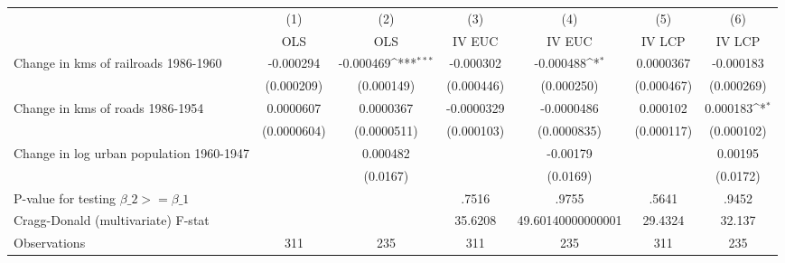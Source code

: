 {
\def\sym#1{\ifmmode^{#1}\else\(^{#1}\)\fi}
\begin{tabular}{l*{6}{c}}
\hline\hline
                &\multicolumn{1}{c}{(1)}&\multicolumn{1}{c}{(2)}&\multicolumn{1}{c}{(3)}&\multicolumn{1}{c}{(4)}&\multicolumn{1}{c}{(5)}&\multicolumn{1}{c}{(6)}\\
                &\multicolumn{1}{c}{OLS}&\multicolumn{1}{c}{OLS}&\multicolumn{1}{c}{IV EUC}&\multicolumn{1}{c}{IV EUC}&\multicolumn{1}{c}{IV LCP}&\multicolumn{1}{c}{IV LCP}\\
\hline
Change in kms of railroads 1986-1960&-0.000294         &-0.000469\sym{***}&-0.000302         &-0.000488\sym{*}  &0.0000367         &-0.000183         \\
                &(0.000209)         &(0.000149)         &(0.000446)         &(0.000250)         &(0.000467)         &(0.000269)         \\
[1em]
Change in kms of roads 1986-1954&0.0000607         &0.0000367         &-0.0000329         &-0.0000486         & 0.000102         & 0.000183\sym{*}  \\
                &(0.0000604)         &(0.0000511)         &(0.000103)         &(0.0000835)         &(0.000117)         &(0.000102)         \\
[1em]
Change in log urban population 1960-1947&                  & 0.000482         &                  & -0.00179         &                  &  0.00195         \\
                &                  & (0.0167)         &                  & (0.0169)         &                  & (0.0172)         \\
\hline
P-value for testing $\beta\_{2} >= \beta\_{1}$&                  &                  &    .7516         &    .9755         &    .5641         &    .9452         \\
Cragg-Donald (multivariate) F-stat&                  &                  &  35.6208         &49.60140000000001         &  29.4324         &   32.137         \\
Observations    &      311         &      235         &      311         &      235         &      311         &      235         \\
\hline\hline
\end{tabular}
}
